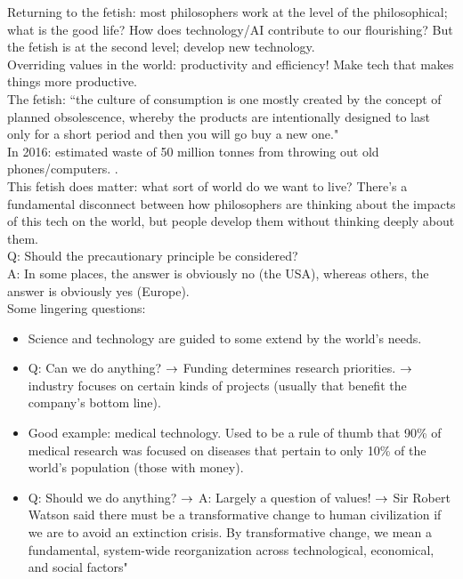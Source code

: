 Returning to the fetish: most philosophers work at the level of the philosophical; what is the good life? How does technology/AI contribute to our flourishing? But the fetish is at the second level; develop new technology. \\

Overriding values in the world: productivity and efficiency! Make tech that makes things more productive. \\

The fetish: ``the culture of consumption is one mostly created by the concept of planned obsolescence, whereby the products are intentionally designed to last only for a short period and then you will go buy a new one."\\

In 2016: estimated waste of 50 million tonnes from throwing out old phones/computers. . \\

This fetish does matter: what sort of world do we want to live? There's a fundamental disconnect between how philosophers are thinking about the impacts of this tech on the world, but people develop them without thinking deeply about them. \\

Q: Should the precautionary principle be considered? \\

A: In some places, the answer is obviously no (the USA), whereas others, the answer is obviously yes (Europe). \\

Some lingering questions:
\begin{itemize}
\item Science and technology are guided to some extend by the world's needs.
\item Q: Can we do anything?
$\rightarrow$ Funding determines research priorities.
$\rightarrow$ industry focuses on certain kinds of projects (usually that benefit the company's bottom line).
\item Good example: medical technology. Used to be a rule of thumb that 90\% of medical research was focused on diseases that pertain to only 10\% of the world's population (those with money).
\item Q: Should we do anything? 
$\rightarrow$ A: Largely a question of values!
$\rightarrow$ Sir Robert Watson said there must be a transformative change to human civilization if we are to avoid an extinction crisis. By transformative change, we mean a fundamental, system-wide reorganization across technological, economical, and social factors"
\end{itemize}

